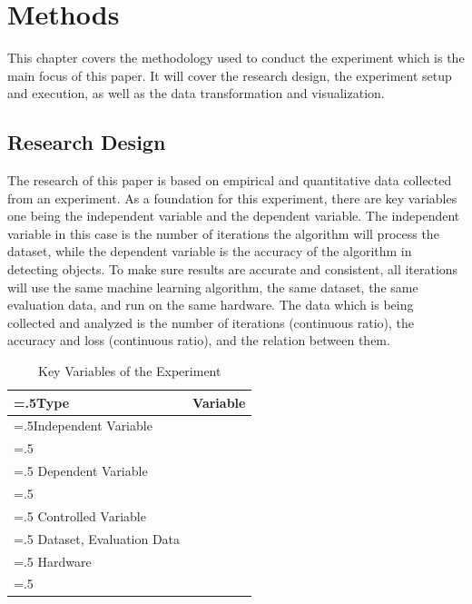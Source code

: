 \section{Methods}
This chapter covers the methodology used to conduct the experiment which is the main focus of this paper.
It will cover the research design, the experiment setup and execution, as well as the data transformation 
and visualization.

\subsection{Research Design}
The research of this paper is based on empirical and quantitative data collected from an experiment.
As a foundation for this experiment, there are key variables one being the independent variable and the 
dependent variable. The independent variable in this case is the number of iterations the algorithm will
process the dataset, while the dependent variable is the accuracy of the algorithm in detecting objects.
To make sure results are accurate and consistent, all iterations will use the same machine learning algorithm,
the same dataset, the same evaluation data, and run on the same hardware.
The data which is being collected and analyzed is the number of iterations (continuous ratio), the accuracy
and loss (continuous ratio), and the relation between them.

\begin{table}[h]
\centering
\begin{tabularx}{\textwidth}{|>{\hsize=.5\hsize}X|>{\hsize=1.5\hsize}X|}
\hline
\textbf{Type} & \textbf{Variable} \\
\hline
Independent Variable & 
\begin{tabular}{@{}l@{}}
\textbullet{} Number of Iterations  \\
\end{tabular} 
\\
\hline
Dependent Variable & 
\begin{tabular}{@{}l@{}}
\textbullet{} Accuracy of the Model\\
\end{tabular} 
\\
\hline
Controlled Variable & 
\begin{tabular}{@{}l@{}}
\textbullet{} Machine Learning Algorithm \\
\textbullet{} Dataset, Evaluation Data \\
\textbullet{} Hardware \\
\end{tabular} 
\\
\hline
\end{tabularx}
\caption{Key Variables of the Experiment}
\label{table:1}
\end{table}

